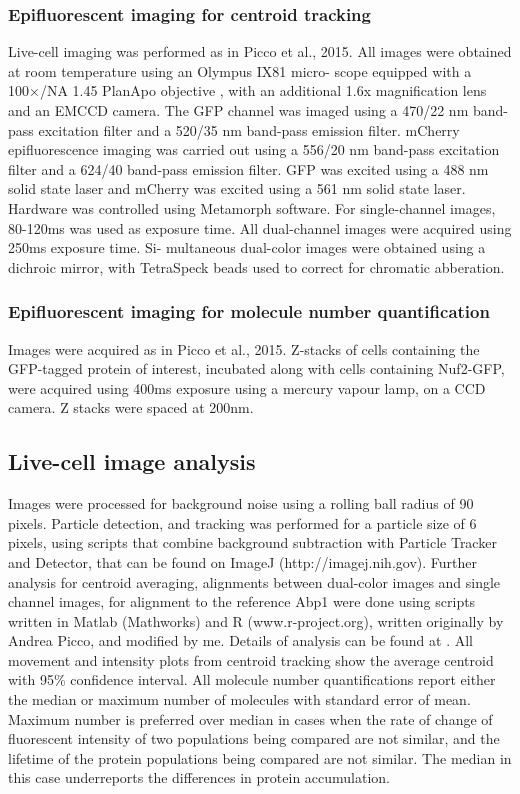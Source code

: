 \documentclass[9pt,lineno]{elife}
\begin{document}
\subsubsection{Epifluorescent imaging for centroid tracking}
Live-cell imaging was performed as in \citep{Picco2015} Picco et al., 2015. All images were obtained at room temperature using an Olympus IX81 micro- scope equipped with a 100×/NA 1.45 PlanApo objective , with an additional 1.6x magnification lens and an EMCCD camera. The GFP channel was imaged using a 470/22 nm band-pass excitation filter and a 520/35 nm band-pass emission filter. mCherry epifluorescence imaging was carried out using a 556/20 nm band-pass excitation filter and a 624/40 band-pass emission filter. GFP was excited using a 488 nm solid state laser and mCherry was excited using a 561 nm solid state laser. Hardware was controlled using Metamorph software. For single-channel images, 80-120ms was used as exposure time. All dual-channel images were acquired using 250ms exposure time. Si- multaneous dual-color images were obtained using a dichroic mirror, with TetraSpeck beads used to correct for chromatic abberation.

\subsubsection{Epifluorescent imaging for molecule number quantification}
Images were acquired as in Picco et al., 2015. Z-stacks of cells containing the GFP-tagged protein of interest, incubated along with cells containing Nuf2-GFP, were acquired using 400ms exposure using a mercury vapour lamp, on a CCD camera. Z stacks were spaced at 200nm.

\subsection{Live-cell image analysis}

Images were processed for background noise using a rolling ball radius of 90 pixels. Particle detection, and tracking was performed for a particle size of 6 pixels, using scripts that combine background subtraction with Particle Tracker and Detector, that can be found on ImageJ (http://imagej.nih.gov). Further analysis for centroid averaging, alignments between dual-color images and single channel images, for alignment to the reference Abp1 were done using scripts written in Matlab (Mathworks) and R (www.r-project.org), written originally by Andrea Picco, and modified by me. Details of analysis can be found at \citep{Picco2015}. All movement and intensity plots from centroid tracking show the average centroid with 95\% confidence interval. All molecule number quantifications report either the median or maximum number of molecules with standard error of mean. Maximum number is preferred over median in cases when the rate of change of fluorescent intensity of two populations being compared are not similar, and the lifetime of the protein populations being compared are not similar. The median in this case underreports the differences in protein accumulation.
\end{document}
